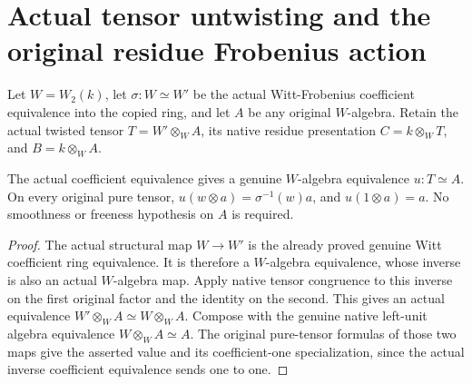 \section{Actual tensor untwisting and the original residue Frobenius action}
\label{sec:witt-two-residue-untwist}

Let $W=W_2(k)$, let $\sigma:W\simeq W'$ be the actual Witt-Frobenius
coefficient equivalence into the copied ring, and let $A$ be any original
$W$-algebra. Retain the actual twisted tensor $T=W'\otimes_W A$, its
native residue presentation $C=k\otimes_W T$, and $B=k\otimes_W A$.

\begin{theorem}
\label{thm:witt-two-source-native-untwist}
\leanok
{}
The actual coefficient equivalence gives a genuine $W$-algebra equivalence
$u:T\simeq A$. On every original pure tensor,
$u(w\otimes a)=\sigma^{-1}(w)a$, and $u(1\otimes a)=a$.
No smoothness or freeness hypothesis on $A$ is required.
\end{theorem}
\begin{proof}
The actual structural map $W\to W'$ is the already proved genuine
Witt coefficient ring equivalence. It is therefore a $W$-algebra
equivalence, whose inverse is also an actual $W$-algebra map.
Apply native tensor congruence to this inverse on the first original
factor and the identity on the second. This gives an actual equivalence
$W'\otimes_W A\simeq W\otimes_W A$. Compose with the genuine native
left-unit algebra equivalence $W\otimes_W A\simeq A$.
The original pure-tensor formulas of those two maps give the asserted
value and its coefficient-one specialization, since the actual inverse
coefficient equivalence sends one to one.
\end{proof}

